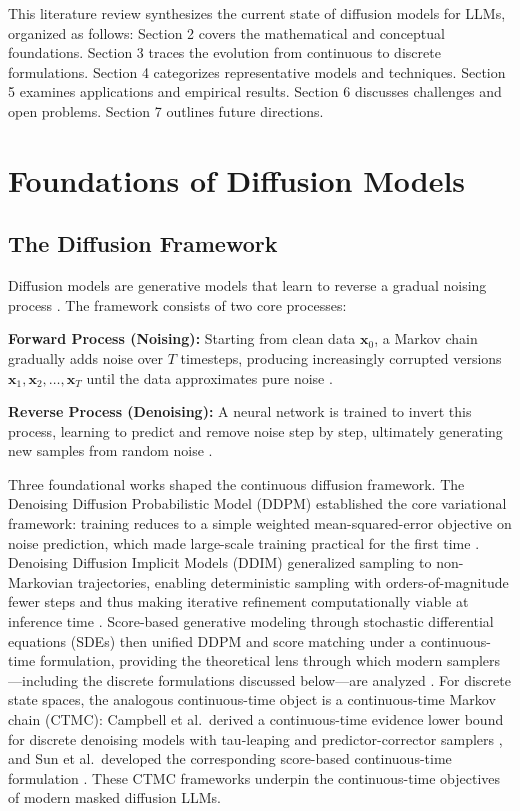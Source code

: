 \documentclass[11pt]{article}
\begin{document}
This literature review synthesizes the current state of diffusion models for LLMs, organized as follows: Section 2 covers the mathematical and conceptual foundations. Section 3 traces the evolution from continuous to discrete formulations. Section 4 categorizes representative models and techniques. Section 5 examines applications and empirical results. Section 6 discusses challenges and open problems. Section 7 outlines future directions.

\section{Foundations of Diffusion Models}

\subsection{The Diffusion Framework}

Diffusion models are generative models that learn to reverse a gradual noising process \cite{ho2020denoising}. The framework consists of two core processes:

\textbf{Forward Process (Noising):} Starting from clean data $\mathbf{x}_0$, a Markov chain gradually adds noise over $T$ timesteps, producing increasingly corrupted versions $\mathbf{x}_1, \mathbf{x}_2, \ldots, \mathbf{x}_T$ until the data approximates pure noise \cite{tseng2025diffusion}.

\textbf{Reverse Process (Denoising):} A neural network is trained to invert this process, learning to predict and remove noise step by step, ultimately generating new samples from random noise \cite{ho2020denoising}.

Three foundational works shaped the continuous diffusion framework. The Denoising Diffusion Probabilistic Model (DDPM) established the core variational framework: training reduces to a simple weighted mean-squared-error objective on noise prediction, which made large-scale training practical for the first time \cite{ho2020denoising}. Denoising Diffusion Implicit Models (DDIM) generalized sampling to non-Markovian trajectories, enabling deterministic sampling with orders-of-magnitude fewer steps and thus making iterative refinement computationally viable at inference time \cite{song2021ddim}. Score-based generative modeling through stochastic differential equations (SDEs) then unified DDPM and score matching under a continuous-time formulation, providing the theoretical lens through which modern samplers---including the discrete formulations discussed below---are analyzed \cite{song2021scoresde}. For discrete state spaces, the analogous continuous-time object is a continuous-time Markov chain (CTMC): Campbell et al.\ derived a continuous-time evidence lower bound for discrete denoising models with tau-leaping and predictor-corrector samplers \cite{campbell2022ctmc}, and Sun et al.\ developed the corresponding score-based continuous-time formulation \cite{sun2022ctmc}. These CTMC frameworks underpin the continuous-time objectives of modern masked diffusion LLMs.
\end{document}
